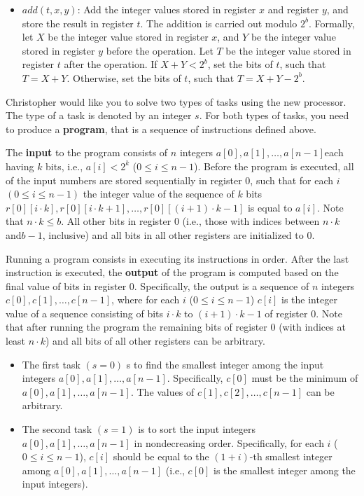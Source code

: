 \begin{itemize}
\item $add(t,x,y)$: Add the integer values stored in register $x$ and register $y$, and store the result in register $t$. The addition is carried out modulo $2^b$.
Formally, let $X$ be the integer value stored in
register $x$, and $Y$ be the integer value stored in register $y$ before the operation. Let $T$ be the
integer value stored in register $t$ after the operation. If  $X+Y < 2^b$,  set the bits of $t$, such that $T = X+Y$.
Otherwise, set the bits of $t$, such that $T=X+Y-2^b$.
\end{itemize}


Christopher would like you to solve two types of tasks using the new processor. The type of a task is
denoted by an integer $s$. For both types of tasks, you need to produce a \textbf{program}, that is a sequence
of instructions defined above.

The \textbf{input} to the program consists of $n$ integers $a[0],a[1],\ldots,a[n-1]$each having $k$ bits, i.e., $a[i] < 2^k$ ($0 \leq i \leq n-1$).
Before the program is executed, all of the input numbers are stored
sequentially in register $0$, such that for each $i$ $(0 \leq i \leq n-1)$ the integer value of the sequence of $k$ bits $r[0][i \cdot k], r[0][i \cdot k + 1], \ldots, r[0][(i+1) \cdot k - 1]$ is equal to $a[i]$. Note that $n \cdot k \leq b$.
All other bits in register $0$ (i.e., those with indices between $n \cdot k$ and$b-1$, inclusive) and all bits in all
other registers are initialized to $0$.

Running a program consists in executing its instructions in order. After the last instruction is executed,
the \textbf{output} of the program is computed based on the final value of bits in register $0$. Specifically, the
output is a sequence of $n$ integers $c[0], c[1], \ldots, c[n-1]$, where for each $i$ ($0 \leq i \leq n-1$) $c[i]$ is the integer value of a sequence consisting of bits $i\cdot k$ to $(i + 1)\cdot k-1$ of register $0$.
Note that
after running the program the remaining bits of register $0$ (with indices at least $n \cdot k$) and all bits of all
other registers can be arbitrary.

\begin{itemize}
\item The first task $(s=0)$ s to find the smallest integer among the input integers $a[0],a[1],\ldots,a[n-1]$. Specifically, $c[0]$ must be the minimum of $a[0], a[1], \ldots, a[n-1]$. The values of $c[1], c[2], \ldots, c[n-1]$ can be arbitrary.

\item The second task $(s=1)$ is to sort the input integers $a[0],a[1],\ldots,a[n-1]$ in
nondecreasing order. Specifically, for each $i$ ($0\leq i\leq n-1$), $c[i]$ should be equal to the $(1+i)$-th smallest integer among $a[0],a[1],\ldots, a[n-1]$ (i.e., $c[0]$ is the smallest integer among the input integers).
\end{itemize}


